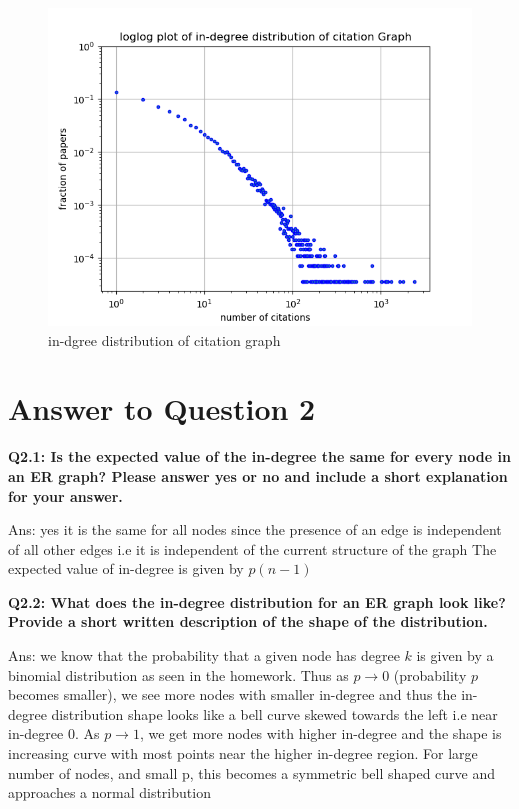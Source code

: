 \documentclass[a4paper]{article}
\begin{document}
\FloatBarrier
\begin{figure}[h]
	\centering 
	\includegraphics[scale = 0.8, clip=True, trim=0cm 0cm 0cm 0.5cm]{Q1_loglog_degree_dist_citgraph.png}
	\caption{in-dgree distribution of citation graph}
\end{figure}
\FloatBarrier

\newpage
\section*{Answer to Question 2}
\textbf{Q2.1: Is the expected value of the in-degree the same for every node in an ER graph?
Please answer yes or no and include a short explanation for your answer.}

Ans: yes it is the same for all nodes since the presence of an edge is independent of
all other edges i.e it is independent of the current structure of the graph
The expected value of in-degree is given by $p(n-1)$

\textbf{Q2.2: What does the in-degree distribution for an ER graph look like?
Provide a short written description of the shape of the distribution.}

Ans: we know that the probability that a given node has degree $k$ is given by
a binomial distribution as seen in the homework. Thus as $p \to 0$ (probability
$p$ becomes smaller), we see more nodes with smaller in-degree and thus
the in-degree distribution shape looks like a bell curve skewed towards the
left i.e near in-degree 0. As $p \to 1$, we get more nodes with higher in-degree
and the shape is increasing curve with most points near the higher
in-degree region. For large number of nodes, and small p, this becomes
a symmetric bell shaped curve and approaches a normal distribution
\end{document}
